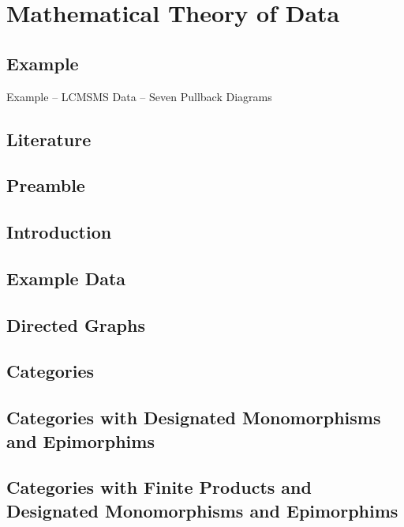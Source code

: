 \section{Mathematical Theory of Data}

\subsection{Example}
\begin{frame}{Example -- LCMSMS Data -- Seven Pullback Diagrams}
\scalebox{0.2}{

}
\end{frame}

\subsection{Literature}



\subsection{Preamble}


\subsection{Introduction}


\subsection{Example Data}


\subsection{Directed Graphs}



\subsection{Categories}


\subsection{Categories with Designated Monomorphisms and Epimorphims}


\subsection{Categories with Finite Products and Designated Monomorphisms and Epimorphims}



\iffalse

\subsection{Entity-Relationship Notation}


\subsection{Unused}

\fi

